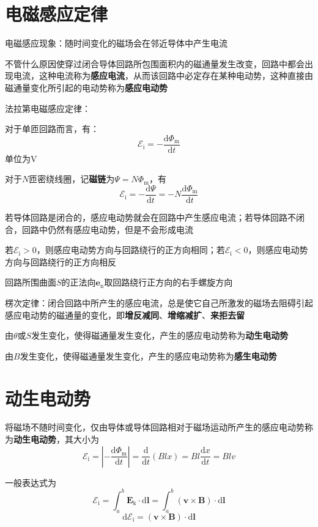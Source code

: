 \documentclass[12pt, a4paper, twoside]{ctexbook}
\begin{document}
\section{电磁感应定律}
{\sonti 电磁感应现象}：随时间变化的磁场会在邻近导体中产生电流

不管什么原因使穿过闭合导体回路所包围面积内的磁通量发生改变，回路中都会出现电流，这种电流称为\textbf{感应电流}，从而该回路中必定存在某种电动势，这种直接由磁通量变化所引起的电动势称为\textbf{感应电动势}

{\sonti 法拉第电磁感应定律}：

对于单匝回路而言，有：
$$
\mathscr{E}_\mathrm{i}=-\frac{\mathrm{d}\varPhi_\mathrm{m}}{\mathrm{d}t}
$$
单位为$\mathrm{V}$

对于$N$匝密绕线圈，记\textbf{磁链}为$\varPsi=N\varPhi_\mathrm{m}$，有
$$
\mathscr{E}_\mathrm{i}=-\frac{\mathrm{d}\varPsi}{\mathrm{d}t}=-N\frac{\mathrm{d}\varPhi_\mathrm{m}}{\mathrm{d}t}
$$

若导体回路是闭合的，感应电动势就会在回路中产生感应电流；若导体回路不闭合，回路中仍然有感应电动势，但是不会形成电流

若$\mathscr{E}_\mathrm{i}>0$，则感应电动势方向与回路绕行的正方向相同；若$\mathscr{E}_\mathrm{i}<0$，则感应电动势方向与回路绕行的正方向相反

回路所围曲面$S$的正法向$\boldsymbol{e}_\mathrm{n}$取回路绕行正方向的右手螺旋方向

{\sonti 楞次定律}：闭合回路中所产生的感应电流，总是使它自己所激发的磁场去阻碍引起感应电动势的磁通量的变化，即\textbf{增反减同}、\textbf{增缩减扩}、\textbf{来拒去留}

由$\theta$或$S$发生变化，使得磁通量发生变化，产生的感应电动势称为\textbf{动生电动势}

由$B$发生变化，使得磁通量发生变化，产生的感应电动势称为\textbf{感生电动势}

\section{动生电动势}
将磁场不随时间变化，仅由导体或导体回路相对于磁场运动所产生的感应电动势称为\textbf{动生电动势}，其大小为
$$
\mathscr{E}_\mathrm{i}=\left|-\frac{\mathrm{d}\varPhi_\mathrm{m}}{\mathrm{d}t}\right|=\frac{\mathrm{d}}{\mathrm{d}t}\left(Blx\right)=Bl\frac{\mathrm{d}x}{\mathrm{d}t}=Blv
$$

一般表达式为
$$
\mathscr{E}_\mathrm{i}=\int_{a}^{b}\boldsymbol{E}_\mathrm{k}\cdot\mathrm{d}\boldsymbol{l}=\int_{a}^{b}\left(\boldsymbol{v}\times\boldsymbol{B}\right)\cdot\mathrm{d}\boldsymbol{l}
$$
$$
\mathrm{d}\mathscr{E}_\mathrm{i}=\left(\boldsymbol{v}\times\boldsymbol{B}\right)\cdot\mathrm{d}\boldsymbol{l}
$$
\end{document}
